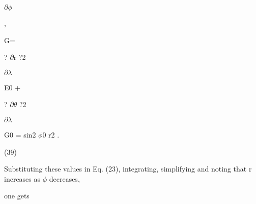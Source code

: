 \documentclass[a4paper,portrait,12pt]{article}
\begin{document}
\begin{flushleft}
$\partial$$\phi$
\end{flushleft}





,





\begin{flushleft}
G=
\end{flushleft}





\begin{flushleft}
? $\partial$r ?2
\end{flushleft}


\begin{flushleft}
$\partial$$\lambda$
\end{flushleft}





\begin{flushleft}
E0 +
\end{flushleft}





\begin{flushleft}
? $\partial$$\theta$ ?2
\end{flushleft}


\begin{flushleft}
$\partial$$\lambda$
\end{flushleft}





\begin{flushleft}
G0 = sin2 $\phi$0 r2 .
\end{flushleft}





(39)





\begin{flushleft}
Substituting these values in Eq. (23), integrating, simplifying and noting that r increases as $\phi$ decreases,
\end{flushleft}


\begin{flushleft}
one gets
\end{flushleft}


\begin{flushleft}

\end{flushleft}
\end{document}

